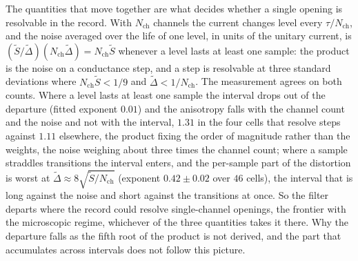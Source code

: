 The quantities that move together are what decides whether a single opening is resolvable in the record. With $N_{\mathrm{ch}}$ channels the current changes level every $\tau/N_{\mathrm{ch}}$, and the noise averaged over the life of one level, in units of the unitary current, is $(\widetilde{S}/\widetilde{\Delta})(N_{\mathrm{ch}}\widetilde{\Delta}) = N_{\mathrm{ch}}\widetilde{S}$ whenever a level lasts at least one sample: the product is the noise on a conductance step, and a step is resolvable at three standard deviations where $N_{\mathrm{ch}}\widetilde{S} < 1/9$ and $\widetilde{\Delta} < 1/N_{\mathrm{ch}}$. The measurement agrees on both counts. Where a level lasts at least one sample the interval drops out of the departure (fitted exponent $0.01$) and the anisotropy falls with the channel count and the noise and not with the interval, $1.31$ in the four cells that resolve steps against $1.11$ elsewhere, the product fixing the order of magnitude rather than the weights, the noise weighing about three times the channel count; where a sample straddles transitions the interval enters, and the per-sample part of the distortion is worst at $\widetilde{\Delta} \approx 8\sqrt{\widetilde{S}/N_{\mathrm{ch}}}$ (exponent $0.42 \pm 0.02$ over $46$ cells), the interval that is long against the noise and short against the transitions at once. So the filter departs where the record could resolve single-channel openings, the frontier with the microscopic regime, whichever of the three quantities takes it there. Why the departure falls as the fifth root of the product is not derived, and the part that accumulates across intervals does not follow this picture. %

